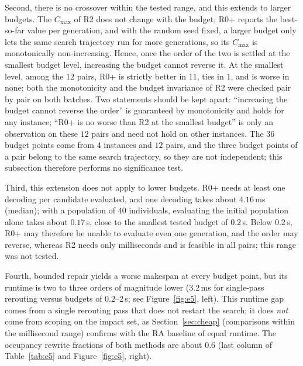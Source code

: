 \documentclass[manuscript,screen,review]{acmart}
\newcommand{\MsRepairMed}{3.2}
\newcommand{\EfiveInst}{4}          %
\newcommand{\EfiveCells}{12}        %
\newcommand{\EfivePts}{36}          %
\newcommand{\EfiveWinMin}{11}       %
\newcommand{\EfiveTieMin}{1}        %
\newcommand{\MsRedecode}{4.16}       %
\begin{document}
Second, there is no crossover within the tested range, and this extends to larger budgets. The \(C_{\max}\) of R2 does not change with the budget;
R0+ reports the best-so-far value per generation, and with the random seed fixed, a larger budget only lets the same search trajectory run for more generations, so its \(C_{\max}\) is monotonically non-increasing.
Hence, once the order of the two is settled at the smallest budget level, increasing the budget cannot reverse it. At the smallest level, among the \(\EfiveCells\) pairs,
R0+ is strictly better in \(\EfiveWinMin\), ties in \(\EfiveTieMin\), and is worse in none; both the monotonicity and the budget invariance of R2
were checked pair by pair on both batches. Two statements should be kept apart: ``increasing the budget cannot reverse the order'' is guaranteed by monotonicity and holds for any instance;
``R0+ is no worse than R2 at the smallest budget'' is only an observation on these \(\EfiveCells\) pairs and need not hold on other instances.
The \(\EfivePts\) budget points come from \(\EfiveInst\) instances and \(\EfiveCells\) pairs, and the three budget points of a pair belong to the same search trajectory,
so they are not independent; this subsection therefore performs no significance test.

Third, this extension does not apply to lower budgets. R0+ needs at least one decoding per candidate evaluated, and one decoding takes about
\(\MsRedecode\)\,ms (median); with a population of \(40\) individuals, evaluating the initial population alone takes about \(0.17\)\,s,
close to the smallest tested budget of \(0.2\)\,s. Below \(0.2\)\,s, R0+ may therefore be unable to evaluate even one generation, and the order may reverse,
whereas R2 needs only milliseconds and is feasible in all pairs; this range was not tested.

Fourth, bounded repair yields a worse makespan at every budget point, but its runtime is two to three orders of magnitude lower
(\(\MsRepairMed\)\,ms for single-pass rerouting versus budgets of \(0.2\)--\(2\)\,s; see Figure~\ref{fig:e5}, left).
This runtime gap comes from a single rerouting pass that does not restart the search; it does \emph{not} come from scoping on the impact set,
as Section~\ref{sec:cheap} (comparisons within the millisecond range) confirms with the RA baseline of equal runtime.
The occupancy rewrite fractions of both methods are about \(0.6\) (last column of Table~\ref{tab:e5} and Figure~\ref{fig:e5}, right).
\end{document}
